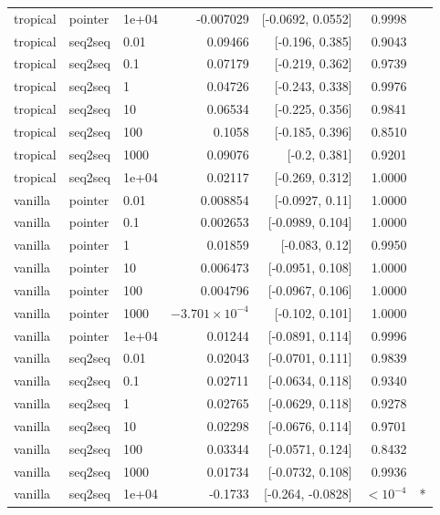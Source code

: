 \documentclass[10pt]{article}
\begin{document}
{\begin{longtable}{lllrrrl}
tropical & pointer & 1e+04 & -0.007029 & [-0.0692, 0.0552] & 0.9998 & \\
tropical & seq2seq & 0.01 & 0.09466 & [-0.196, 0.385] & 0.9043 & \\
tropical & seq2seq & 0.1 & 0.07179 & [-0.219, 0.362] & 0.9739 & \\
tropical & seq2seq & 1 & 0.04726 & [-0.243, 0.338] & 0.9976 & \\
tropical & seq2seq & 10 & 0.06534 & [-0.225, 0.356] & 0.9841 & \\
tropical & seq2seq & 100 & 0.1058 & [-0.185, 0.396] & 0.8510 & \\
tropical & seq2seq & 1000 & 0.09076 & [-0.2, 0.381] & 0.9201 & \\
tropical & seq2seq & 1e+04 & 0.02117 & [-0.269, 0.312] & 1.0000 & \\
vanilla & pointer & 0.01 & 0.008854 & [-0.0927, 0.11] & 1.0000 & \\
vanilla & pointer & 0.1 & 0.002653 & [-0.0989, 0.104] & 1.0000 & \\
vanilla & pointer & 1 & 0.01859 & [-0.083, 0.12] & 0.9950 & \\
vanilla & pointer & 10 & 0.006473 & [-0.0951, 0.108] & 1.0000 & \\
vanilla & pointer & 100 & 0.004796 & [-0.0967, 0.106] & 1.0000 & \\
vanilla & pointer & 1000 & $-3.701\times10^{-4}$ & [-0.102, 0.101] & 1.0000 & \\
vanilla & pointer & 1e+04 & 0.01244 & [-0.0891, 0.114] & 0.9996 & \\
vanilla & seq2seq & 0.01 & 0.02043 & [-0.0701, 0.111] & 0.9839 & \\
vanilla & seq2seq & 0.1 & 0.02711 & [-0.0634, 0.118] & 0.9340 & \\
vanilla & seq2seq & 1 & 0.02765 & [-0.0629, 0.118] & 0.9278 & \\
vanilla & seq2seq & 10 & 0.02298 & [-0.0676, 0.114] & 0.9701 & \\
vanilla & seq2seq & 100 & 0.03344 & [-0.0571, 0.124] & 0.8432 & \\
vanilla & seq2seq & 1000 & 0.01734 & [-0.0732, 0.108] & 0.9936 & \\
vanilla & seq2seq & 1e+04 & -0.1733 & [-0.264, -0.0828] & $<10^{-4}$ & *\\
\bottomrule
\end{longtable}
}
\end{document}
